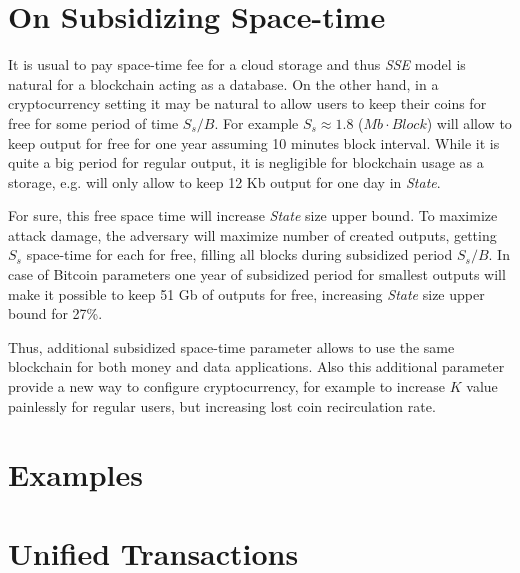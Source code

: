 \documentclass[]{llncs}   %
\newcommand{\authnote}[2]{\marginpar{\parbox{\marginparwidth}{\tiny %
  \textsf{#1 {\textcolor{blue}{notes: #2}}}}}%
  \textcolor{blue}{\textbf{\dag}}}
\newcommand{\authnote}[2]{
  \textsf{#1 \textcolor{blue}{: #2}}}
\newcommand{\authnote}[2]{}
\newcommand{\knote}[1]{{\authnote{\textcolor{green}{Alex notes}}{#1}}}
\newcommand{\esse}{\textit{SSE}}
\newcommand{\state}{\textit{State}}
\begin{document}



\appendix

\section{On Subsidizing Space-time}
\label{sec:subsidy}

It is usual to pay space-time fee for a cloud storage and thus \esse{} model is natural for a blockchain acting as a database. On the other hand, in a cryptocurrency setting it may be natural to allow users to keep their coins for free for some period of time $S_s/B$. For example $S_s \approx 1.8$ ($Mb \cdot Block$) will allow to keep output for free for one year assuming 10 minutes block interval. While it is quite a big period for regular output, it is negligible for blockchain usage as a storage, e.g. will only allow to keep 12 Kb output for one day in \state{}.

For sure, this free space time will increase \state{} size upper bound. To maximize attack damage, the adversary will maximize number of created outputs, getting $S_s$ space-time for each for free, filling all blocks during subsidized period $S_s/B$. In case of Bitcoin parameters one year of subsidized period for smallest outputs will make it possible to keep 51 Gb of outputs for free, increasing \state{} size upper bound for 27\%.

Thus, additional subsidized space-time parameter allows to use the same blockchain for both money and data applications. Also this additional parameter provide a new way to configure cryptocurrency, for example to increase $K$ value painlessly for regular users, but increasing lost coin recirculation rate.

\section{Examples}

\knote{moneychain and datachain}

\section{Unified Transactions}

\knote{We can throw away specially coinbase transactions getting unified transaction format, by requiring fees to be paid in form of anyone-can-spend output, and by creating constant rewards in predefined and hard-coded pre-genesis state, where a reward for a certain height is an output in the pre-genesis UTXO spendable only at this height.}
\end{document}
